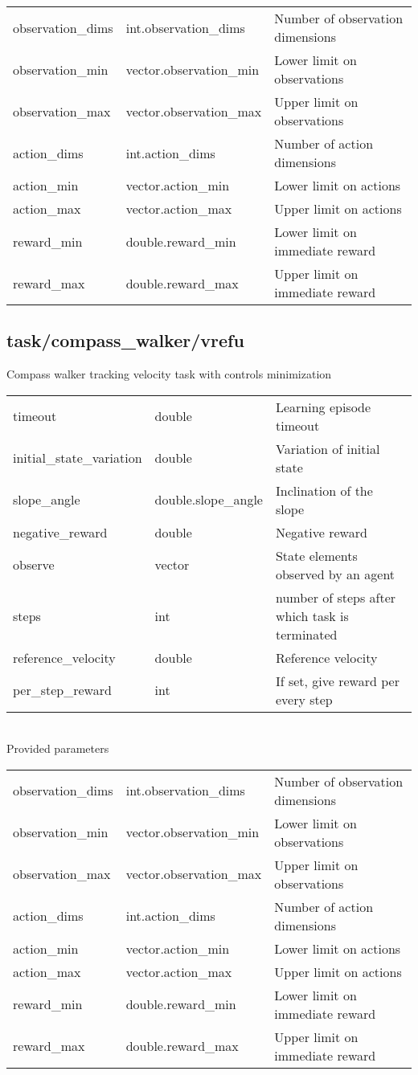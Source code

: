 \noindent\begin{tabular}{@{}lll@{}}
observation\_dims&int.observation\_dims&Number of observation dimensions\\
observation\_min&vector.observation\_min&Lower limit on observations\\
observation\_max&vector.observation\_max&Upper limit on observations\\
action\_dims&int.action\_dims&Number of action dimensions\\
action\_min&vector.action\_min&Lower limit on actions\\
action\_max&vector.action\_max&Upper limit on actions\\
reward\_min&double.reward\_min&Lower limit on immediate reward\\
reward\_max&double.reward\_max&Upper limit on immediate reward\\
\end{tabular}
\subsection{task/compass\_walker/vrefu}
\noindent Compass walker tracking velocity task with controls minimization\\

\noindent\begin{tabular}{@{}lll@{}}
timeout&double&Learning episode timeout\\
initial\_state\_variation&double&Variation of initial state\\
slope\_angle&double.slope\_angle&Inclination of the slope\\
negative\_reward&double&Negative reward\\
observe&vector&State elements observed by an agent\\
steps&int&number of steps after which task is terminated\\
reference\_velocity&double&Reference velocity\\
per\_step\_reward&int&If set, give reward per every step\\
\end{tabular}
\\

\noindent Provided parameters\\

\noindent\begin{tabular}{@{}lll@{}}
observation\_dims&int.observation\_dims&Number of observation dimensions\\
observation\_min&vector.observation\_min&Lower limit on observations\\
observation\_max&vector.observation\_max&Upper limit on observations\\
action\_dims&int.action\_dims&Number of action dimensions\\
action\_min&vector.action\_min&Lower limit on actions\\
action\_max&vector.action\_max&Upper limit on actions\\
reward\_min&double.reward\_min&Lower limit on immediate reward\\
reward\_max&double.reward\_max&Upper limit on immediate reward\\
\end{tabular}
